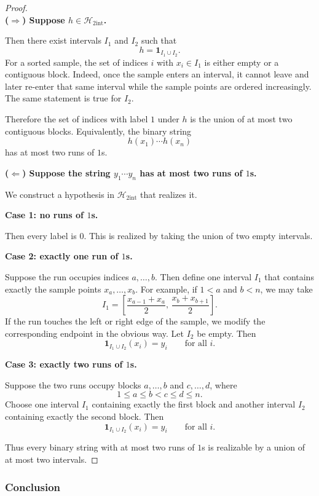 \documentclass{article}
\newcommand{\classA}{\mathcal{H}_{2\mathrm{int}}}
\begin{document}
\begin{solutionbox}
\begin{proof}
\leavevmode\\
\textbf{(\(\Rightarrow\)) Suppose \(h\in\classA\).}

Then there exist intervals \(I_1\) and \(I_2\) such that
\[
h=\mathbf{1}_{I_1\cup I_2}.
\]
For a sorted sample, the set of indices \(i\) with \(x_i\in I_1\) is either
empty or a contiguous block. Indeed, once the sample enters an interval, it
cannot leave and later re-enter that same interval while the sample points are
ordered increasingly. The same statement is true for \(I_2\).

Therefore the set of indices with label \(1\) under \(h\) is the union of at
most two contiguous blocks. Equivalently, the binary string
\[
h(x_1)\cdots h(x_n)
\]
has at most two runs of \(1\)s.

\textbf{(\(\Leftarrow\)) Suppose the string \(y_1\cdots y_n\) has at most two
runs of \(1\)s.}

We construct a hypothesis in \(\classA\) that realizes it.

\textbf{Case 1: no runs of \(1\)s.}

Then every label is \(0\). This is realized by taking the union of two empty
intervals.

\textbf{Case 2: exactly one run of \(1\)s.}

Suppose the run occupies indices \(a,\dots,b\). Then define one interval \(I_1\)
that contains exactly the sample points \(x_a,\dots,x_b\). For example, if
\(1<a\) and \(b<n\), we may take
\[
I_1=
\left[\frac{x_{a-1}+x_a}{2},\,\frac{x_b+x_{b+1}}{2}\right].
\]
If the run touches the left or right edge of the sample, we modify the
corresponding endpoint in the obvious way. Let \(I_2\) be empty. Then
\[
\mathbf{1}_{I_1\cup I_2}(x_i)=y_i
\qquad\text{for all }i.
\]

\textbf{Case 3: exactly two runs of \(1\)s.}

Suppose the two runs occupy blocks \(a,\dots,b\) and \(c,\dots,d\), where
\[
1\le a\le b < c\le d\le n.
\]
Choose one interval \(I_1\) containing exactly the first block and another
interval \(I_2\) containing exactly the second block. Then
\[
\mathbf{1}_{I_1\cup I_2}(x_i)=y_i
\qquad\text{for all }i.
\]

Thus every binary string with at most two runs of \(1\)s is realizable by a
union of at most two intervals.
\end{proof}

\subsubsection{Conclusion}


\end{solutionbox}
\end{document}
